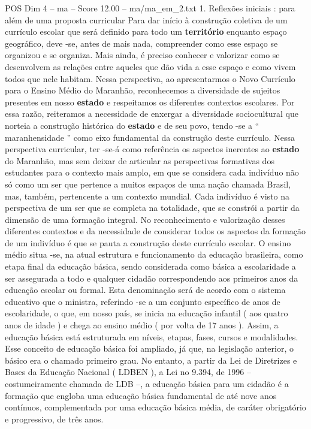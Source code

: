 \begin{textsample}{POS Dim 4 – ma – Score 12.00 – ma/ma\_em\_2.txt}  \label{ex:f4_pos_057}
1.
Reflexões iniciais : para além de uma proposta curricular Para dar início à construção coletiva de um currículo escolar que será definido para todo um \textbf{território} enquanto espaço geográfico, deve -se, antes de mais nada, compreender como esse espaço se organizou e se organiza.
Mais ainda, é preciso conhecer e valorizar como se desenvolvem as relações entre aqueles que dão vida a esse espaço e como vivem todos que nele habitam.
Nessa perspectiva, ao apresentarmos o Novo Currículo para o Ensino Médio do Maranhão, reconhecemos a diversidade de sujeitos presentes em nosso \textbf{estado} e respeitamos os diferentes contextos escolares.
Por essa razão, reiteramos a necessidade de enxergar a diversidade sociocultural que norteia a construção histórica do \textbf{estado} e de seu povo, tendo -se a “ maranhensidade ” como eixo fundamental da construção deste currículo.
Nessa perspectiva curricular, ter -se-á como referência os aspectos inerentes ao \textbf{estado} do Maranhão, mas sem deixar de articular as perspectivas formativas dos estudantes para o contexto mais amplo, em que se considera cada indivíduo não só como um ser que pertence a muitos espaços de uma nação chamada Brasil, mas, também, pertencente a um contexto mundial.
Cada indivíduo é visto na perspectiva de um ser que se completa na totalidade, que se constrói a partir da dimensão de uma formação integral.
No reconhecimento e valorização desses diferentes contextos e da necessidade de considerar todos os aspectos da formação de um indivíduo é que se pauta a construção deste currículo escolar.
O ensino médio situa -se, na atual estrutura e funcionamento da educação brasileira, como etapa final da educação básica, sendo considerada como básica a escolaridade a ser assegurada a todo e qualquer cidadão correspondendo aos primeiros anos da educação escolar ou formal.
Esta denominação será de acordo com o sistema educativo que o ministra, referindo -se a um conjunto específico de anos de escolaridade, o que, em nosso país, se inicia na educação infantil ( aos quatro anos de idade ) e chega ao ensino médio ( por volta de 17 anos ).
Assim, a educação básica está estruturada em níveis, etapas, fases, cursos e modalidades.
Esse conceito de educação básica foi ampliado, já que, na legislação anterior, o básico era o chamado primeiro grau.
No entanto, a partir da Lei de Diretrizes e Bases da Educação Nacional ( LDBEN ), a Lei no 9.394, de 1996 – costumeiramente chamada de LDB –, a educação básica para um cidadão é a formação que engloba uma educação básica fundamental de até nove anos contínuos, complementada por uma educação básica média, de caráter obrigatório e progressivo, de três anos.

\end{textsample}
